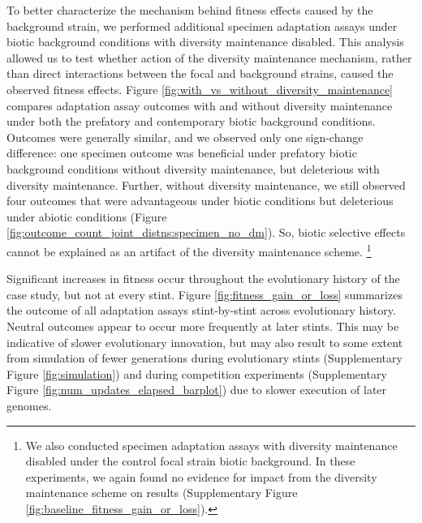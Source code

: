 

To better characterize the mechanism behind fitness effects caused by the background strain, we performed additional specimen adaptation assays under biotic background conditions with diversity maintenance disabled.
This analysis allowed us to test whether action of the diversity maintenance mechanism, rather than direct interactions between the focal and background strains, caused the observed fitness effects.
Figure \ref{fig:with_vs_without_diversity_maintenance} compares adaptation assay outcomes with and without diversity maintenance under both the prefatory and contemporary biotic background conditions.
Outcomes were generally similar, and we observed only one sign-change difference: one specimen outcome was beneficial under prefatory biotic background conditions without diversity maintenance, but deleterious with diversity maintenance.
Further, without diversity maintenance, we still observed four outcomes that were advantageous under biotic conditions but deleterious under abiotic conditions (Figure \ref{fig:outcome_count_joint_distns:specimen_no_dm}).
So, biotic selective effects cannot be explained as an artifact of the diversity maintenance scheme.%
\footnote{
We also conducted specimen adaptation assays with diversity maintenance disabled under the control focal strain biotic background.
In these experiments, we again found no evidence for impact from the diversity maintenance scheme on results
(Supplementary Figure \ref{fig:baseline_fitness_gain_or_loss}).
}



Significant increases in fitness occur throughout the evolutionary history of the case study, but not at every stint.
Figure \ref{fig:fitness_gain_or_loss} summarizes the outcome of all adaptation assays stint-by-stint across evolutionary history.
Neutral outcomes appear to occur more frequently at later stints.
This may be indicative of slower evolutionary innovation, but may also result to some extent from simulation of fewer generations during evolutionary stints (Supplementary Figure \ref{fig:simulation}) and during competition experiments (Supplementary Figure \ref{fig:num_updates_elapsed_barplot}) due to slower execution of later genomes.



